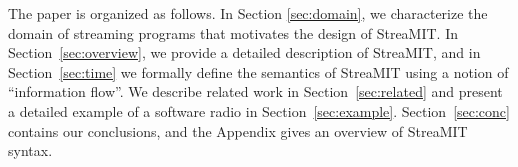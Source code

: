 The paper is organized as follows. In Section {\ref{sec:domain}}, we
characterize the domain of streaming programs that motivates the
design of StreaMIT.  In Section~\ref{sec:overview}, we provide a
detailed description of StreaMIT, and in Section~\ref{sec:time} we
formally define the semantics of StreaMIT using a notion of
``information flow''. We describe related work in
Section~\ref{sec:related} and present a detailed example of a software
radio in Section~\ref{sec:example}.  Section~\ref{sec:conc} contains
our conclusions, and the Appendix gives an overview of StreaMIT
syntax.


